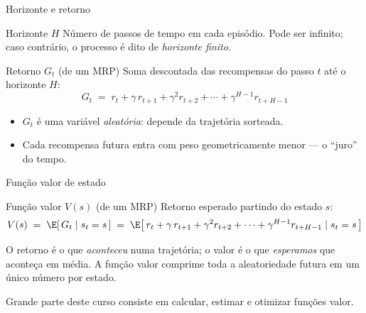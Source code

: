 \documentclass[aspectratio=169, 11pt]{beamer}
\begin{document}
\begin{frame}{Horizonte e retorno}
  \begin{defbox}{Horizonte $H$}
    Número de passos de tempo em cada episódio. Pode ser infinito; caso
    contrário, o processo é dito de \emph{horizonte finito}.
  \end{defbox}

  \begin{defbox}{Retorno $G_t$ (de um MRP)}
    Soma descontada das recompensas do passo $t$ até o horizonte $H$:
    \[
      G_t \;=\; r_t + \gamma\, r_{t+1} + \gamma^2 r_{t+2} + \cdots
              + \gamma^{H-1} r_{t+H-1}
    \]
  \end{defbox}

  \begin{itemize}
    \item $G_t$ é uma variável \emph{aleatória}: depende da trajetória
          sorteada.
    \item Cada recompensa futura entra com peso geometricamente menor —
          o ``juro'' do tempo.
  \end{itemize}
\end{frame}

\begin{frame}{Função valor de estado}
  \begin{defbox}{Função valor $V(s)$ (de um MRP)}
    Retorno esperado partindo do estado $s$:
    \[
      V(s) \;=\; \E[\, G_t \mid s_t = s \,]
           \;=\; \E\bigl[\, r_t + \gamma\, r_{t+1} + \gamma^2 r_{t+2}
                 + \cdots + \gamma^{H-1} r_{t+H-1} \mid s_t = s \,\bigr]
    \]
  \end{defbox}

  \begin{ideiabox}
    O retorno é o que \emph{aconteceu} numa trajetória; o valor é o que
    \emph{esperamos} que aconteça em média. A função valor comprime toda a
    aleatoriedade futura em um único número por estado.
  \end{ideiabox}

  {\small\color{rlCinza} Grande parte deste curso consiste em calcular,
  estimar e otimizar funções valor.}
\end{frame}
\end{document}
